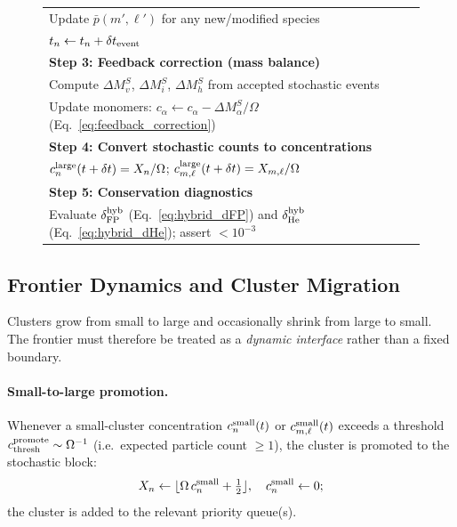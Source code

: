 \begin{figure}[htbp]
\begin{tabular}{l}
\qquad Update $\bar{p}(m',\ell')$ for any new/modified species \\
\qquad $t_n \leftarrow t_n + \delta t_{\rm event}$ \\[3pt]
%
\textbf{Step 3: Feedback correction (mass balance)} \\
\quad Compute $\Delta M_v^S$, $\Delta M_i^S$, $\Delta M_h^S$
  from accepted stochastic events \\
\quad Update monomers:
  $c_\alpha \leftarrow c_\alpha - \Delta M_\alpha^S / \Omega$
  (Eq.~\ref{eq:feedback_correction}) \\[3pt]
%
\textbf{Step 4: Convert stochastic counts to concentrations} \\
\quad $c_n^{\rm large}(t+\delta t) = X_n/\Omega$;\quad
  $c_{m,\ell}^{\rm large}(t+\delta t) = X_{m,\ell}/\Omega$ \\[3pt]
%
\textbf{Step 5: Conservation diagnostics} \\
\quad Evaluate $\delta_{\rm FP}^{\rm hyb}$
  (Eq.~\ref{eq:hybrid_dFP}) and $\delta_{\rm He}^{\rm hyb}$
  (Eq.~\ref{eq:hybrid_dHe}); assert $< 10^{-3}$ \\
\hline\hline
\end{tabular}
\label{alg:hybrid}
\end{figure}

\subsection{Frontier Dynamics and Cluster Migration}
\label{sec:hybrid_frontier}

Clusters grow from small to large and occasionally shrink from large
to small.  The frontier must therefore be treated as a \emph{dynamic
interface} rather than a fixed boundary.

\paragraph{Small-to-large promotion.}
Whenever a small-cluster concentration $c_n^{\rm small}(t)$ or
$c_{m,\ell}^{\rm small}(t)$ exceeds a threshold
$c_{\rm thresh}^{\rm promote} \sim \Omega^{-1}$ (i.e.\ expected
particle count $\geq 1$), the cluster is promoted to the stochastic
block:
\begin{equation}\label{eq:promote}
    X_n \leftarrow \lfloor \Omega\,c_n^{\rm small} + \tfrac{1}{2} \rfloor,
    \quad
    c_n^{\rm small} \leftarrow 0;
\end{equation}
the cluster is added to the relevant priority queue(s).

